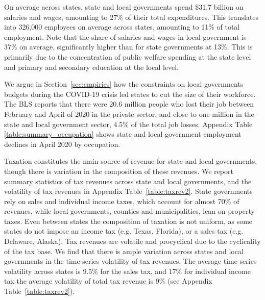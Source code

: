 On average across states, state and local governments spend \$31.7 billion on salaries and wages, amounting to 27\% of their total expenditures. 
This translates into 326,000 employees on average across states, amounting to 11\% of total employment. Note that the share of salaries and wages in local government is 37\% on average, significantly higher than for state governments at 13\%. This is primarily due to the concentration of public welfare spending at the state level and primary and secondary education at the local level. 

We argue in Section~\ref{sec:empirics} how the constraints on local governments budgets during the COVID-19 crisis led states to cut the size of their workforce. 
The BLS reports that there were 20.6 million people who lost their job between February and April of 2020 in the private sector, and close to one million in the state and local government sector, 4.5\% of the total job losses. Appendix Table \ref{table:summary_occupation} shows state and local government employment declines in April 2020 by occupation. 

Taxation constitutes the main source of revenue for state and local governments, though there is variation in the composition of these revenues. 
We report summary statistics of tax revenues across state and local governments, and the volatility of tax revenues in Appendix Table~\ref{table:taxrev2}.
State governments rely on sales and individual income taxes, which account for almost 70\% of revenues, while local governments, counties and municipalities, lean on property taxes. Even between states the composition of taxation is not uniform, as some states do not impose an income tax (e.g. Texas, Florida), or a sales tax (e.g. Delaware, Alaska). 
Tax revenues are volatile and procyclical due to the cyclicality of the tax base. We find that there is ample variation across states and local governments in the time-series volatility of tax revenues. 
The average time-series volatility across states is 9.5\% for the sales tax, and 17\% for individual income tax \textemdash the average volatility of total tax revenue is 9\% (see Appendix Table~\ref{table:taxrev2}).

